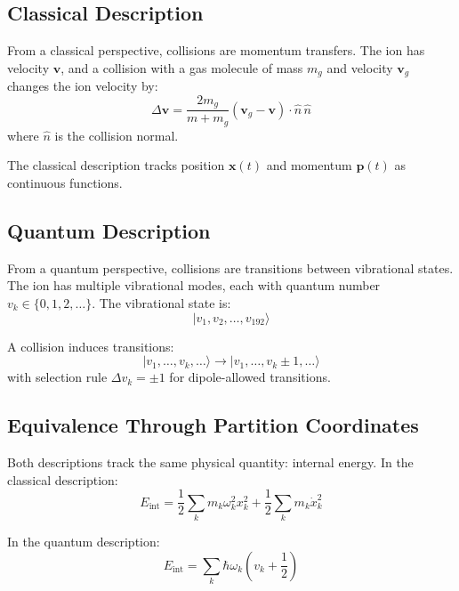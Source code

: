 \documentclass[twocolumn,10pt]{article}
\theoremstyle{remark}
\begin{document}
\subsection{Classical Description}

From a classical perspective, collisions are momentum transfers. The ion has velocity $\mathbf{v}$, and a collision with a gas molecule of mass $m_g$ and velocity $\mathbf{v}_g$ changes the ion velocity by:
\begin{equation}
\Delta \mathbf{v} = \frac{2m_g}{m + m_g}(\mathbf{v}_g - \mathbf{v}) \cdot \hat{n} \, \hat{n}
\end{equation}
where $\hat{n}$ is the collision normal.

The classical description tracks position $\mathbf{x}(t)$ and momentum $\mathbf{p}(t)$ as continuous functions.

\subsection{Quantum Description}

From a quantum perspective, collisions are transitions between vibrational states. The ion has multiple vibrational modes, each with quantum number $v_k \in \{0, 1, 2, \ldots\}$. The vibrational state is:
\begin{equation}
|v_1, v_2, \ldots, v_{192}\rangle
\end{equation}

A collision induces transitions:
\begin{equation}
|v_1, \ldots, v_k, \ldots\rangle \to |v_1, \ldots, v_k \pm 1, \ldots\rangle
\end{equation}
with selection rule $\Delta v_k = \pm 1$ for dipole-allowed transitions.

\subsection{Equivalence Through Partition Coordinates}

Both descriptions track the same physical quantity: internal energy. In the classical description:
\begin{equation}
E_{\text{int}} = \frac{1}{2} \sum_k m_k \omega_k^2 x_k^2 + \frac{1}{2} \sum_k m_k \dot{x}_k^2
\end{equation}

In the quantum description:
\begin{equation}
E_{\text{int}} = \sum_k \hbar \omega_k \left(v_k + \frac{1}{2}\right)
\end{equation}
\end{document}
